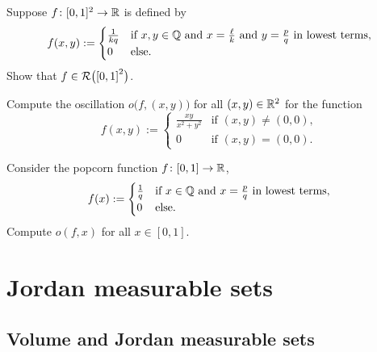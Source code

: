 \begin{exercise}
Suppose 
$f \colon [0,1]^2 \to {\mathbb{R}}$ is defined by
\begin{equation*}
f(x,y) :=
\begin{cases}
\frac{1}{kq} & \text{if } x,y \in {\mathbb{Q}} \text{ and } x = \frac{\ell}{k}
\text{ and } y=\frac{p}{q} \text{ in lowest terms,} \\
0            & \text{else.}
\end{cases}
\end{equation*}
Show that $f \in {\mathcal{R}}\bigl({[0,1]}^2\bigr)$.
\end{exercise}

\begin{exercise}
Compute the oscillation $o\bigl(f,(x,y)\bigr)$ for all $(x,y) \in {\mathbb{R}}^2$
for the function
\begin{equation*}
f(x,y) :=
\begin{cases}
\frac{xy}{x^2+y^2} & \text{if } (x,y) \not= (0,0), \\
0                  & \text{if } (x,y) = (0,0) .
\end{cases}
\end{equation*}
\end{exercise}

\begin{exercise}
Consider the popcorn function $f \colon [0,1] \to {\mathbb{R}}$,
\begin{equation*}
f(x) :=
\begin{cases}
\frac{1}{q} & \text{if } x \in {\mathbb{Q}} \text{ and } x = \frac{p}{q}
 \text{ in lowest terms,} \\
0           & \text{else.}
\end{cases}
\end{equation*}
Compute $o(f,x)$ for all $x \in [0,1]$.
\end{exercise}



\sectionnewpage
\section{Jordan measurable sets}
\label{sec:jordansets}


\subsection{Volume and Jordan measurable sets}

